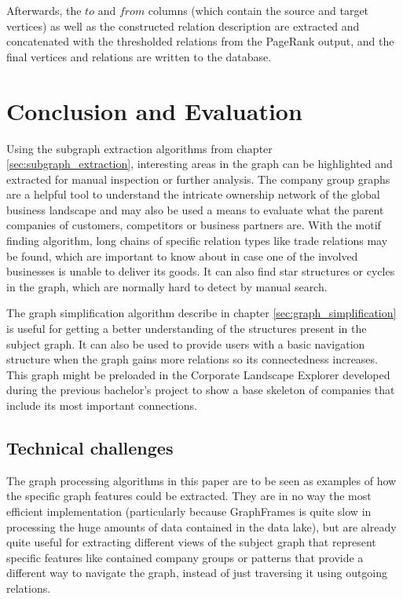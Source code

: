 \documentclass[
        a4paper,     %
        titlepage,   %
        oneside,     %
        parskip      %
]{scrartcl}          %
\begin{document}
  Afterwards, the $to$ and $from$ columns (which contain the source and target vertices)
  as well as the constructed relation description are extracted and concatenated with the thresholded
  relations from the PageRank output, and the final vertices and relations are written
  to the database.

  \section{Conclusion and Evaluation}
  Using the subgraph extraction algorithms from chapter \ref{sec:subgraph_extraction},
  interesting areas in the graph can be highlighted and extracted for manual inspection
  or further analysis. The company group graphs are a helpful tool to understand the intricate
  ownership network of the global business landscape and may also be used a means to evaluate
  what the parent companies of customers, competitors or business partners are.
  With the motif finding algorithm, long chains of specific relation types like
  trade relations may be found, which are important to know about in case one of
  the involved businesses is unable to deliver its goods. It can also find star
  structures or cycles in the graph, which are normally hard to detect by manual
  search.

  The graph simplification algorithm describe in chapter \ref{sec:graph_simplification}
  is useful for getting a better understanding of the structures present in the subject graph.
  It can also be used to provide users with a basic navigation structure when the
  graph gains more relations so its connectedness increases. This graph might
  be preloaded in the Corporate Landscape Explorer developed during the previous
  bachelor's project to show a base skeleton of companies that include its most
  important connections.

  \subsection{Technical challenges}
  The graph processing algorithms in this paper are to be seen as examples of
  how the specific graph features could be extracted. They are in no way the most
  efficient implementation (particularly because GraphFrames is quite slow in
  processing the huge amounts of data contained in the data lake), but are already
  quite useful for extracting different views of the subject graph that represent
  specific features like contained company groups or patterns that provide a different
  way to navigate the graph, instead of just traversing it using outgoing relations.
\end{document}
